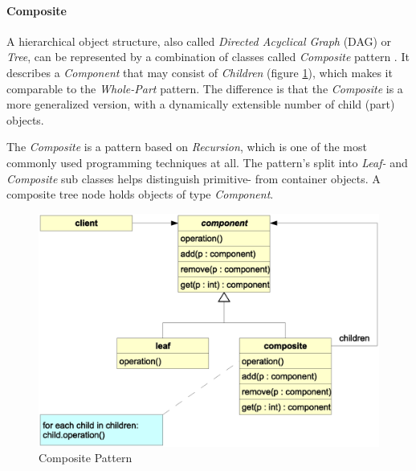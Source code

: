 %
%
%
%
%
%
%

\paragraph{Composite}
\label{composite_heading}

A hierarchical object structure, also called \emph{Directed Acyclical Graph}
(DAG) or \emph{Tree}, can be represented by a combination of classes called
\emph{Composite} pattern \cite{gamma1995}. It describes a \emph{Component} that
may consist of \emph{Children} (figure \ref{composite_figure}), which makes it
comparable to the \emph{Whole-Part} pattern. The difference is that the
\emph{Composite} is a more generalized version, with a dynamically extensible
number of child (part) objects.

The \emph{Composite} is a pattern based on \emph{Recursion}, which is one of
the most commonly used programming techniques at all. The pattern's split into
\emph{Leaf-} and \emph{Composite} sub classes helps distinguish primitive- from
container objects. A composite tree node holds objects of type \emph{Component}.

\begin{figure}[ht]
    \begin{center}
        \includegraphics[scale=0.3]{vector/composite.eps}
        \caption{Composite Pattern}
        \label{composite_figure}
    \end{center}
\end{figure}
